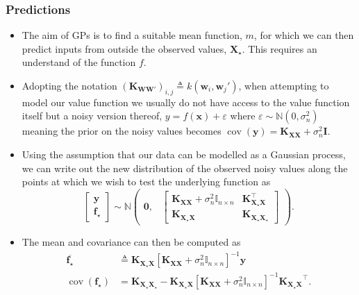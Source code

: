\documentclass[9pt,hyperref={pdfpagelabels=false},xcolor=table]{beamer}
\begin{document}
\begin{frame}
    \frametitle{Predictions}
    \begin{itemize}
        \item The aim of GPs is to find a suitable mean function, $m$, for which we can then predict inputs from outside the observed values, $\bm{X_{\star}}$. This requires an understand of the function $f$.
        \item Adopting the notation $\left( \bm{K}_{\bm{W} \bm{W}'} \right)_{i,j} \triangleq k \left( \bm{w}_i , \bm{w}_j' \right)$, when attempting to model our value function we usually do not have access to the value function itself but a noisy version thereof, $y = f(\bm{x}) + \varepsilon$ where $\varepsilon \sim \mathbb{N} (0, \sigma_n^2)$ meaning the prior on the noisy values becomes $\operatorname{cov} (\bm{y}) = \bm{K_{XX}} + \sigma_n^2 \bm{I}$.
        \item Using the assumption that our data can be modelled as a Gaussian process, we can write out the new distribution of the observed noisy values along the points at which we wish to test the underlying function as
              \[
                  \begin{bmatrix}
                      \bm{y} \\
                      \bm{f}_{\star}
                  \end{bmatrix}
                  \sim \mathbb{N}
                  \begin{pmatrix}
                      \bm{0}, &
                      {
                              \begin{bmatrix}
                                  \bm{K_{XX}} + \sigma_n^2 \mathbb{I}_{n \times n} & \bm{K_{X_{\star}X}^{\intercal}} \\
                                  \bm{K_{X_{\star}X}}                              & \bm{K_{X_{\star}X_{\star}}}
                              \end{bmatrix}
                          }
                  \end{pmatrix}.
              \]
        \item The mean and covariance can then be computed as
              \begin{align*}
                  \overline{\bm{f}_{\star}}           & \triangleq \bm{K_{X_{\star}X}} \left[ \bm{K_{XX}} + \sigma_n^2 \mathbb{I}_{n \times n} \right]^{-1} \bm{y}                                                \\
                  \operatorname{cov} (\bm{f}_{\star}) & = \bm{K_{X_{\star}X_{\star}}} - \bm{K_{X_{\star}X}} \left[ \bm{K_{XX}} + \sigma_n^2 \mathbb{I}_{n \times n} \right]^{-1} \bm{K_{X_{\star}X}}^{\intercal}.
              \end{align*}
    \end{itemize}
\end{frame}
\end{document}
